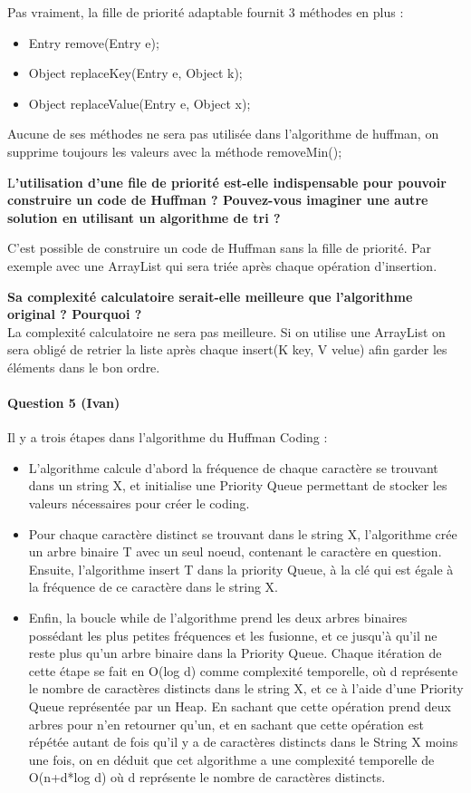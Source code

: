 \documentclass[a4paper]{article}
\begin{document}
Pas vraiment, la fille de priorité adaptable fournit 3 méthodes en plus :
\begin{itemize}
	\item Entry remove(Entry e);
	\item Object replaceKey(Entry e, Object k);
	\item Object replaceValue(Entry e, Object x);
\end{itemize}

Aucune de ses méthodes ne sera pas utilisée dans l'algorithme de huffman, on supprime toujours les valeurs avec la méthode removeMin(); 

L\textbf{’utilisation d’une file de priorité est-elle indispensable pour pouvoir construire un code de Huffman ? Pouvez-vous imaginer une autre solution en utilisant un algorithme de tri ? }

C’est possible de construire un code de Huffman sans la fille de priorité. Par exemple avec une ArrayList qui sera triée après chaque opération d’insertion.

\textbf{Sa complexité calculatoire serait-elle meilleure que l’algorithme original ? Pourquoi ?}\\
La complexité calculatoire ne sera pas meilleure. Si on utilise une ArrayList on sera obligé de retrier la liste après chaque insert(K key, V velue) afin garder les éléments dans le bon ordre.  


\paragraph*{Question 5 (Ivan)}
Il y a trois étapes dans l’algorithme du Huffman Coding : 
\begin{itemize}


\item L’algorithme calcule d’abord la fréquence de chaque caractère se trouvant dans un string X, et initialise une Priority Queue permettant de stocker les valeurs nécessaires pour créer le coding. 
\item Pour chaque caractère distinct se trouvant dans le string X, l’algorithme crée un arbre binaire T avec un seul noeud, contenant le caractère en question. Ensuite, l’algorithme insert T dans la priority Queue, à la clé qui est égale à la fréquence de ce caractère dans le string X. 
\item Enfin, la boucle while de l’algorithme prend les deux arbres binaires possédant les plus petites fréquences et les fusionne, et ce jusqu’à qu’il ne reste plus qu’un arbre binaire dans la Priority Queue. Chaque itération de cette étape se fait en O(log d) comme complexité temporelle, où d représente le nombre de caractères distincts dans le string X, et ce à l’aide d’une Priority Queue représentée par un Heap. En sachant que cette opération prend deux arbres pour n’en retourner qu’un, et en sachant que cette opération est répétée autant de fois qu’il y a de caractères distincts dans le String X moins une fois, on en déduit que cet algorithme a une complexité temporelle de O(n+d*log d) où d représente le nombre de caractères distincts. 
\end{itemize}
\end{document}
